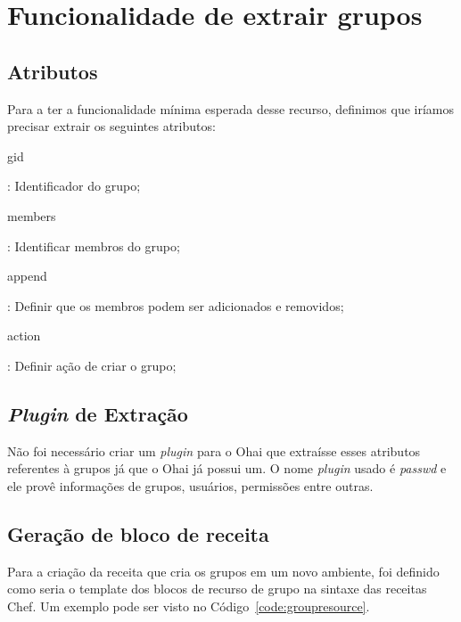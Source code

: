\section{Funcionalidade de extrair grupos}
\label{sec:groups}

\subsection{Atributos}

Para a ter a funcionalidade mínima esperada desse recurso, definimos que iríamos precisar
extrair os seguintes atributos:

\begin{itemize}
    {\itshape\item gid}: Identificador do grupo;
    {\itshape\item members}: Identificar membros do grupo;
\end{itemize}


\begin{itemize}
    {\itshape\item append}: Definir que os membros podem ser adicionados e removidos;
    {\itshape\item action}: Definir ação de criar o grupo;
\end{itemize}

\subsection{\textit{Plugin} de Extração}
Não foi necessário criar um \textit{plugin} para o Ohai que extraísse esses atributos
referentes à grupos já que o Ohai já possui um. O nome \textit{plugin} usado é 
\textit{passwd} e ele provê informações de grupos, usuários, permissões entre outras.

\subsection{Geração de bloco de receita}

Para a criação da receita que cria os grupos em um novo ambiente, foi definido
como seria o template dos blocos de recurso de grupo na sintaxe das receitas Chef.
Um exemplo pode ser visto no Código~\ref{code:groupresource}.

\noindent\begin{minipage}{\textwidth}
  \lstset{style=shell}
  
\end{minipage}\hfill

